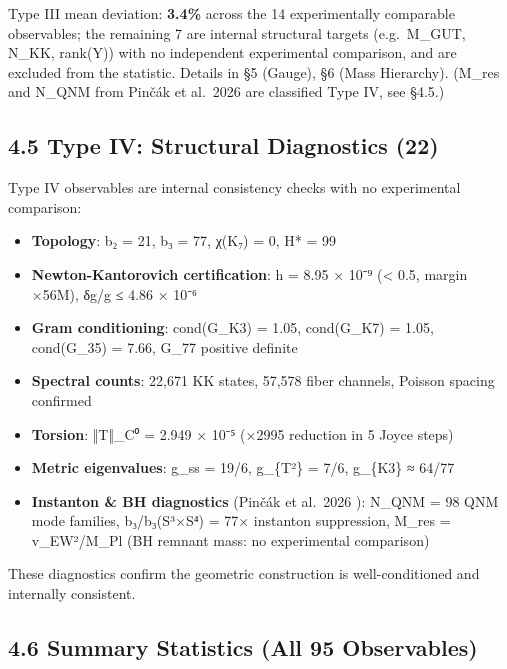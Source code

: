 \documentclass[11pt,a4paper]{article}
\begin{document}
Type III mean deviation: \textbf{3.4\%} across the 14 experimentally comparable observables; the remaining 7 are internal structural targets (e.g.~M\_\allowbreak{}GUT, N\_\allowbreak{}KK, rank(Y)) with no independent experimental comparison, and are excluded from the statistic. Details in §5 (Gauge), §6 (Mass Hierarchy). (M\_\allowbreak{}res and N\_\allowbreak{}QNM from Pinčák et al.~2026 \cite{42} are classified Type IV, see §4.5.)

\subsection{4.5 Type IV: Structural Diagnostics (22)}\label{type-iv-structural-diagnostics-22}

Type IV observables are internal consistency checks with no experimental comparison:

\begin{itemize}
\tightlist
\item
  \textbf{Topology}: b₂ = 21, b₃ = 77, χ(K₇) = 0, H* = 99
\item
  \textbf{Newton-Kantorovich certification}: h = 8.95 × 10⁻⁹ (\textless{} 0.5, margin ×56M), δg/g ≤ 4.86 × 10⁻⁶
\item
  \textbf{Gram conditioning}: cond(G\_\allowbreak{}K3) = 1.05, cond(G\_\allowbreak{}K7) = 1.05, cond(G\_\allowbreak{}35) = 7.66, G\_\allowbreak{}77 positive definite
\item
  \textbf{Spectral counts}: 22,671 KK states, 57,578 fiber channels, Poisson spacing confirmed
\item
  \textbf{Torsion}: ‖T‖\_\allowbreak{}C⁰ = 2.949 × 10⁻⁵ (×2995 reduction in 5 Joyce steps)
\item
  \textbf{Metric eigenvalues}: g\_\allowbreak{}ss = 19/6, g\_\allowbreak{}\{T²\} = 7/6, g\_\allowbreak{}\{K3\} ≈ 64/77
\item
  \textbf{Instanton \& BH diagnostics} (Pinčák et al.~2026 \cite{42}): N\_\allowbreak{}QNM = 98 QNM mode families, b₃/b₃(S³×S⁴) = 77× instanton suppression, M\_\allowbreak{}res = v\_\allowbreak{}EW²/M\_\allowbreak{}Pl (BH remnant mass: no experimental comparison)
\end{itemize}

These diagnostics confirm the geometric construction is well-conditioned and internally consistent.

\subsection{4.6 Summary Statistics (All 95 Observables)}\label{summary-statistics-all-95-observables}
\end{document}
